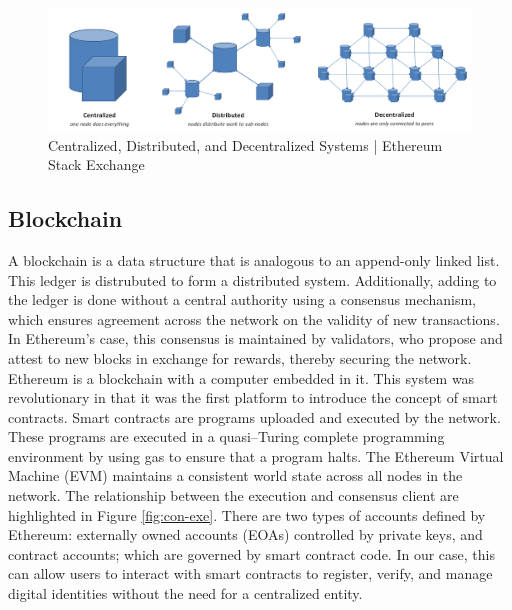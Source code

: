 \documentclass[conference]{IEEEtran}
\begin{document}
\begin{figure}[h!]
    \centering
    \includegraphics[width=0.9\linewidth]{decentralized.png}
    \caption{Centralized, Distributed, and Decentralized Systems | Ethereum Stack Exchange}
    \label{fig:decentralized}
\end{figure}

\subsection{Blockchain}
A blockchain is a data structure that is analogous to an append-only linked list. This ledger is distrubuted to form a distributed system. Additionally, adding to the ledger is done without a central authority using a consensus mechanism, which ensures agreement across the network on the validity of new transactions. In Ethereum’s case, this consensus is maintained by validators, who propose and attest to new blocks in exchange for rewards, thereby securing the network. Ethereum is a blockchain with a computer embedded in it. This system was revolutionary in that it was the first platform to introduce the concept of smart contracts. Smart contracts are programs uploaded and executed by the network. These programs are executed in a quasi–Turing complete programming environment by using gas to ensure that a program halts. The Ethereum Virtual Machine (EVM) maintains a consistent world state across all nodes in the network. The relationship between the execution and consensus client are highlighted in Figure \ref{fig:con-exe}. There are two types of accounts defined by Ethereum: externally owned accounts (EOAs) controlled by private keys, and contract accounts; which are governed by smart contract code. In our case, this can allow users to interact with smart contracts to register, verify, and manage digital identities without the need for a centralized entity. 
\end{document}
